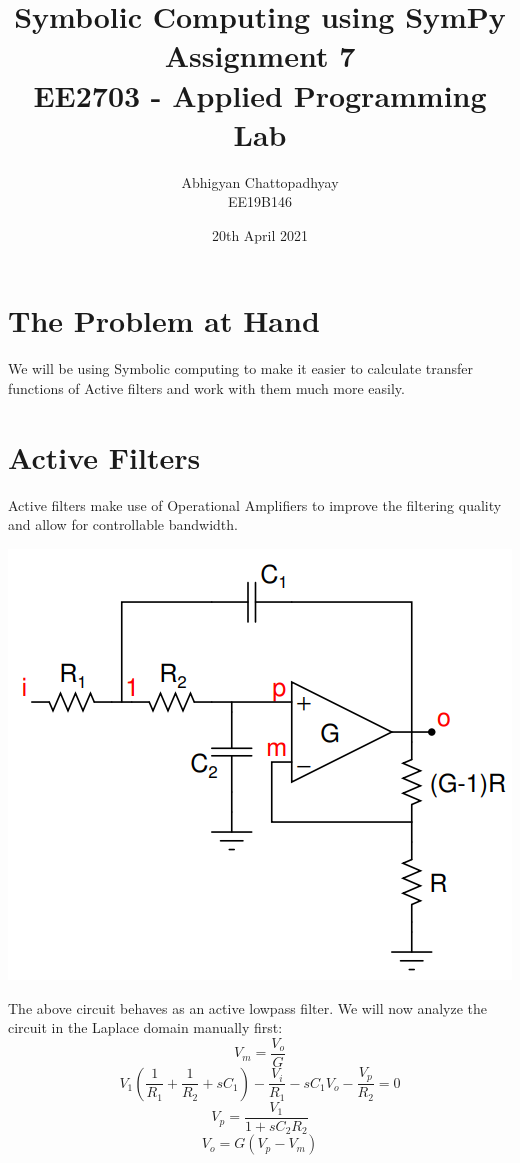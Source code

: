 \documentclass[12pt]{article}
\title{\vspace{-1cm}Symbolic Computing using SymPy\\
\large Assignment 7\\
\large EE2703 - Applied Programming Lab}
\author{Abhigyan Chattopadhyay \\
EE19B146}
\date{20th April 2021}
\begin{document}
\maketitle
\tableofcontents
\pagebreak
\section{The Problem at Hand}
We will be using Symbolic computing to make it easier to calculate transfer functions of Active filters and work with them much more easily.

\section{Active Filters}
Active filters make use of Operational Amplifiers to improve the filtering quality and allow for controllable bandwidth.

\begin{center}
    \includegraphics[scale=1]{images/ckt1.png}
\end{center}

The above circuit behaves as an active lowpass filter. We will now analyze the circuit in the Laplace domain manually first:
\begin{equation}
    V_m = \frac{V_o}{G}
\end{equation}
\begin{equation}
    V_1 \left(\frac{1}{R_1} + \frac{1}{R_2} + s C_1\right) - \frac{V_i}{R_1} - s C_1 V_o - \frac{V_p}{R_2} = 0
\end{equation}
\begin{equation}
    V_p = \frac{V_1}{1+s C_2 R_2}
\end{equation}
\begin{equation}
    V_o = G(V_p - V_m)
\end{equation}
\end{document}
